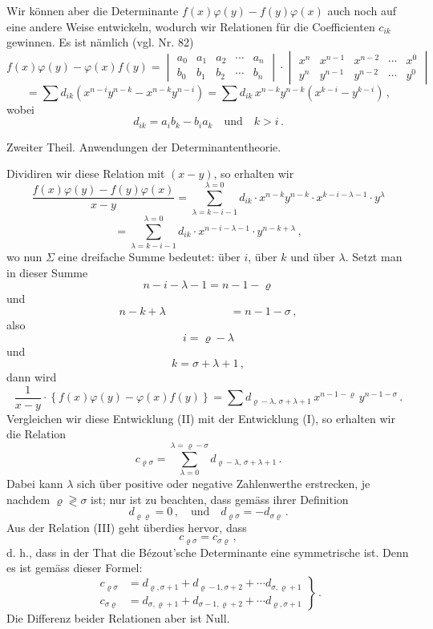\documentclass[11pt]{article}
\providecommand{\weberpage}[1]{}
\providecommand{\weq}[2]{\begin{equation}\tag{#1}#2\end{equation}}
\let\Sigma\varSigma
\begin{document}
Wir k\"onnen aber die Determinante $f(x)\varphi(y) - f(y)\varphi(x)$ auch noch
auf eine andere Weise entwickeln, wodurch wir Relationen f\"ur die
Coefficienten $c_{ik}$ gewinnen. Es ist n\"amlich (vgl. Nr. 82)
\[
f(x)\varphi(y) - \varphi(x)f(y) =
\begin{vmatrix} a_0 & a_1 & a_2 & \cdots & a_n \\ b_0 & b_1 & b_2 & \cdots & b_n \end{vmatrix}
\cdot
\begin{vmatrix} x^n & x^{n-1} & x^{n-2} & \cdots & x^0 \\ y^n & y^{n-1} & y^{n-2} & \cdots & y^0 \end{vmatrix}
\]
\[
= \sum d_{ik}(x^{n-i}y^{n-k} - x^{n-k}y^{n-i}) = \sum d_{ik}\, x^{n-k}y^{n-k}(x^{k-i}-y^{k-i})\,,
\]
wobei
\[
d_{ik} = a_i b_k - b_i a_k \quad \text{und} \quad k > i\,.
\]


\weberpage{160}
Zweiter Theil. Anwendungen der Determinantentheorie.

Dividiren wir diese Relation mit $(x-y)$, so erhalten wir
\[
\frac{f(x)\varphi(y)-f(y)\varphi(x)}{x-y} = \sum_{\lambda=k-i-1}^{\lambda=0} d_{ik} \cdot x^{n-k}y^{n-k} \cdot x^{k-i-\lambda-1} \cdot y^{\lambda}
\]
\[
= \sum_{\lambda=k-i-1}^{\lambda=0} d_{ik} \cdot x^{n-i-\lambda-1} \cdot y^{n-k+\lambda}\,,
\]
wo nun $\Sigma$ eine dreifache Summe bedeutet: \"uber $i$, \"uber $k$ und \"uber
$\lambda$. Setzt man in dieser Summe
\[
n-i-\lambda-1 = n-1-\varrho
\]
und
\[
n-k+\lambda \phantom{n-i-\lambda-1} = n-1-\sigma\,,
\]
also
\[
i = \varrho - \lambda
\]
und
\[
k = \sigma+\lambda+1\,,
\]
dann wird
\weq{II}{
\frac{1}{x-y} \cdot \left\{f(x)\varphi(y) - \varphi(x)f(y)\right\} = \sum d_{\varrho-\lambda,\,\sigma+\lambda+1}\, x^{n-1-\varrho}\, y^{n-1-\sigma}\,.
}
Vergleichen wir diese Entwicklung (II) mit der Entwicklung (I), so
erhalten wir die Relation
\weq{III}{
c_{\varrho\sigma} = \sum_{\lambda=0}^{\lambda=\varrho-\sigma} d_{\varrho-\lambda,\,\sigma+\lambda+1}\,.
}
Dabei kann $\lambda$ sich \"uber positive oder negative Zahlenwerthe
erstrecken, je nachdem $\varrho \gtrless \sigma$ ist; nur ist zu beachten, dass
gem\"ass ihrer Definition
\[
d_{\varrho\varrho} = 0\,, \quad \text{und} \quad d_{\varrho\sigma} = -d_{\sigma\varrho}\,.
\]
Aus der Relation (III) geht \"uberdies hervor, dass
\[
c_{\varrho\sigma} = c_{\sigma\varrho}\,,
\]
d. h., dass in der That die B\'ezout'sche Determinante eine symmetrische
ist. Denn es ist gem\"ass dieser Formel:
\weq{IV}{
\left.
\begin{aligned}
c_{\varrho\sigma} &= d_{\varrho,\sigma+1} + d_{\varrho-1,\sigma+2} + \cdots d_{\sigma,\varrho+1} \\
c_{\sigma\varrho} &= d_{\sigma,\varrho+1} + d_{\sigma-1,\varrho+2} + \cdots d_{\varrho,\sigma+1}
\end{aligned}
\right\}\,.
}
Die Differenz beider Relationen aber ist Null.
\end{document}
